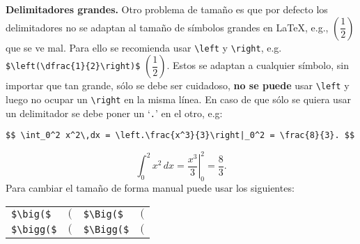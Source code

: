 \documentclass[intro-breve-latex.tex]{subfiles}
\begin{document}
\textbf{Delimitadores grandes.} Otro problema de tamaño es que por defecto los delimitadores no se adaptan al tamaño de símbolos grandes en \LaTeX{}, e.g., $(\dfrac{1}{2})$ que se ve mal. Para ello se recomienda usar \lstinline|\left| y \lstinline|\right|, e.g. \lstinline|$\left(\dfrac{1}{2}\right)$| $\left(\dfrac{1}{2}\right)$. Estos se adaptan a cualquier símbolo, sin importar que tan grande, sólo se debe ser cuidadoso, \textbf{no se puede} usar \lstinline|\left| y luego no ocupar un \lstinline|\right| en la misma línea. En caso de que sólo se quiera usar un delimitador se debe poner un `\texttt{.}' en el otro, e.g:
\begin{lstlisting}
$$ \int_0^2 x^2\,dx = \left.\frac{x^3}{3}\right|_0^2 = \frac{8}{3}. $$
\end{lstlisting}
$$ \int_0^2 x^2\,dx = \left.\frac{x^3}{3}\right|_0^2 = \frac{8}{3}. $$
Para cambiar el tamaño de forma manual puede usar los siguientes:
\begin{center}
	\begin{tabular}{ll|ll}
		\hline \hline
		\lstinline|$\big($|  & $\big($  & \lstinline|$\Big($|  & $\Big($ \\
		\lstinline|$\bigg($| & $\bigg($ & \lstinline|$\Bigg($| & $\Bigg($ \\
		\hline \hline
	\end{tabular}
\end{center}
\end{document}

